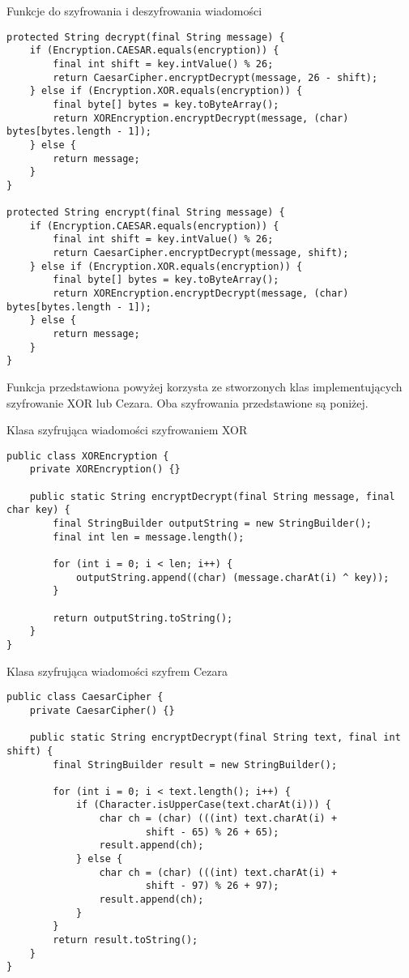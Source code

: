 \documentclass[12pt,a4paper,titlepage]{article}
\begin{document}
\begin{listing}[H]
\caption{Funkcje do szyfrowania i deszyfrowania wiadomości}
\begin{verbatim}
protected String decrypt(final String message) {
    if (Encryption.CAESAR.equals(encryption)) {
        final int shift = key.intValue() % 26;
        return CaesarCipher.encryptDecrypt(message, 26 - shift);
    } else if (Encryption.XOR.equals(encryption)) {
        final byte[] bytes = key.toByteArray();
        return XOREncryption.encryptDecrypt(message, (char) bytes[bytes.length - 1]);
    } else {
        return message;
    }
}

protected String encrypt(final String message) {
    if (Encryption.CAESAR.equals(encryption)) {
        final int shift = key.intValue() % 26;
        return CaesarCipher.encryptDecrypt(message, shift);
    } else if (Encryption.XOR.equals(encryption)) {
        final byte[] bytes = key.toByteArray();
        return XOREncryption.encryptDecrypt(message, (char) bytes[bytes.length - 1]);
    } else {
        return message;
    }
}
\end{verbatim}
\end{listing}

Funkcja przedstawiona powyżej korzysta ze stworzonych klas implementujących szyfrowanie XOR lub Cezara. Oba szyfrowania przedstawione są poniżej.

\begin{listing}[H]
\caption{Klasa szyfrująca wiadomości szyfrowaniem XOR}
\begin{verbatim}
public class XOREncryption {
    private XOREncryption() {}

    public static String encryptDecrypt(final String message, final char key) {
        final StringBuilder outputString = new StringBuilder();
        final int len = message.length();

        for (int i = 0; i < len; i++) {
            outputString.append((char) (message.charAt(i) ^ key));
        }

        return outputString.toString();
    }
}
\end{verbatim}
\end{listing}

\begin{listing}[H]
\caption{Klasa szyfrująca wiadomości szyfrem Cezara}
\begin{verbatim}
public class CaesarCipher {
    private CaesarCipher() {}

    public static String encryptDecrypt(final String text, final int shift) {
        final StringBuilder result = new StringBuilder();

        for (int i = 0; i < text.length(); i++) {
            if (Character.isUpperCase(text.charAt(i))) {
                char ch = (char) (((int) text.charAt(i) +
                        shift - 65) % 26 + 65);
                result.append(ch);
            } else {
                char ch = (char) (((int) text.charAt(i) +
                        shift - 97) % 26 + 97);
                result.append(ch);
            }
        }
        return result.toString();
    }
}
\end{verbatim}
\end{listing}
\end{document}
